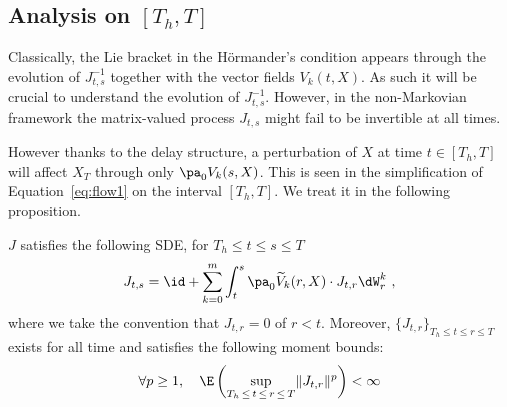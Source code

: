 \subsection{Analysis \texorpdfstring{on $[T_h, T]$}{near T} }

Classically, the Lie bracket in the H\"ormander's condition appears through the evolution of $J^{-1}_{t,s}$ together with the vector fields $V_k(t,X)$. As such it will be crucial to understand the evolution of $J^{-1}_{t,s}$. However, in the non-Markovian framework the matrix-valued process $J_{t,s}$ might fail to be invertible at all times.

However thanks to the delay structure, a perturbation of $X$ at time $t \in [T_h, T]$ will affect $X_T$ through only $\pa_{0} V_k (s,X)$. This is seen in the simplification of Equation~\eqref{eq:flow1} on the interval $[T_h,T]$. We treat it in the following proposition.

\begin{prop}\label{proposition:tangent_flow_sde}
$J$ satisfies the following SDE, for $T_h\leq t \leq s \leq T$
\begin{equation}\label{eq:tangent_flow_sde}
J_{t,s} = \id +\sum_{k=0}^m \int_{t}^s \pa_0 \widetilde{V}_k (r,X) \cdot J_{t,r} \dW_r^k \ ,
\end{equation}
where we take the convention that $J_{t,r}=0$ of $r<t$. Moreover, $\{J_{t,r}\}_{T_h \leq t\leq r \leq T}$ exists for all time and satisfies the following moment bounds:
\[
\forall p \geq 1, \quad \E\left(\sup_{T_h\,\leq\,t \,\leq\,r\,\leq\,T} \lVert J_{t,r} \rVert^p \right) < \infty
\]
\end{prop}

